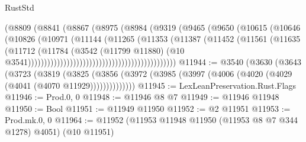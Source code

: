\begin{lexlean}{RustStd}
\begin{coremodule}
                                                  (@8809
                                                    (@8841
                                                      (@8867
                                                        (@8975
                                                          (@8984
                                                            (@9319
                                                              (@9465
                                                                (@9650
                                                                  (@10615
                                                                    (@10646
                                                                      (@10826
                                                                        (@10971
                                                                          (@11144
                                                                            (@11265
                                                                              (@11353
                                                                                (@11387
                                                                                  (@11452
                                                                                    (@11561
                                                                                      (@11635
                                                                                        (@11712
                                                                                          (@11784
                                                                                            (@3542
                                                                                              (@11799
                                                                                                @11880)
                                                                                              (@10
                                                                                                @3541))))))))))))))))))))))))))))))))))))))))))))))
@11944 := @3540
    (@3630
      (@3643
        (@3723
          (@3819
            (@3825
              (@3856 (@3972 (@3985 (@3997 (@4006 (@4020 (@4029 (@4041 (@4070 @11929))))))))))))))
@11945 := LexLeanPreservation.Rust.Flags
@11946 := Prod.{0, 0}
@11948 := @11946 @8 @7
@11949 := @11946 @11948
@11950 := Bool
@11951 := @11949 @11950
@11952 := @2 @11951
@11953 := Prod.mk.{0, 0}
@11964 := @11952 (@11953 @11948 @11950 (@11953 @8 @7 @344 @1278) @4051) (@10 @11951)

\end{coremodule}
\end{lexlean}
